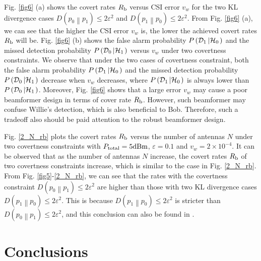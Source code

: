 \documentclass[10pt,journal,letterpaper,twocolumn,twoside]{IEEEtran} %
\begin{document}
 Fig. \ref{fig6} (a) shows  the covert rates $R_{\rm{b}}$ versus CSI error $v_w$ for the two KL divergence cases $D\left( {{p_0}\left\| {{p_1}} \right.} \right) \le 2{\varepsilon ^2}$ and $D\left( {{p_1}\left\| {{p_0}} \right.} \right) \le 2{\varepsilon ^2}$.
 From  Fig. \ref{fig6} (a), we can see that the higher the CSI error $v_w$ is, the lower the achieved covert rates $R_{\rm{b}}$ will be.
    Fig. \ref{fig6} (b) shows the false alarm probability $P \left( {{{\cal D}_1}\left| {{{\cal H}_0}} \right.} \right)$ and the missed detection probability $P \left( {{{\cal D}_0}\left| {{{\cal H}_1}} \right.} \right)$ versus   $v_w$ under
 two covertness constraints.
 We observe that  under the two cases of covertness constraint, both the false alarm probability $P \left( {{{\cal D}_1}\left| {{{\cal H}_0}} \right.} \right)$ and the missed detection probability $P \left( {{{\cal D}_0}\left| {{{\cal H}_1}} \right.} \right)$ decrease when    $v_w$ decreases, where $P \left( {{{\cal D}_1}\left| {{{\cal H}_0}} \right.} \right)$ is always lower than $P \left( {{{\cal D}_0}\left| {{{\cal H}_1}} \right.} \right)$.
 Moreover, Fig. \ref{fig6} shows that a large error $v_w$  may cause a poor beamformer design in terms  of cover rate $R_{\rm{b}}$. However, such beamformer may confuse Willie's detection, which is also beneficial to Bob. Therefore, such a tradeoff also should be paid attention to the  robust beamformer design.

 Fig. \ref{2_N_rb} plots   the covert rates $R_{\rm{b}}$ versus the number of  antennas $N$ under
 two covertness constraints with ${P_{{\rm{total}}}}=5 \rm{dBm}$, $\varepsilon=0.1$ and $v_w={2} \times {10}^{- 4}$.
It can be  observed  that as  the number of antennas $N$ increase, the  covert rates $R_{\rm{b}}$ of  two covertness constraints increase, which is similar to the case in Fig. \ref{2_N_rb}.
  From Fig. \ref{fig5}-\ref{2_N_rb}, we can see that  the rates with the covertness constraint $D\left( {{p_0}\left\| {{p_1}} \right.} \right) \le 2{\varepsilon ^2}$
 are higher than those with   two KL divergence cases  $D\left( {{p_1}\left\| {{p_0}} \right.} \right) \le 2{\varepsilon ^2}$. This is because
    $D\left( {{p_1}\left\| {{p_0}} \right.} \right) \le 2{\varepsilon ^2}$ is stricter than
   $D\left( {{p_0}\left\| {{p_1}} \right.} \right) \le 2{\varepsilon ^2}$, and  this conclusion can also be found in \cite{Yan2019Gaussian}.


\section{Conclusions}
\end{document}
